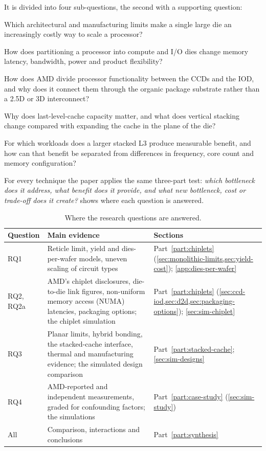 It is divided into four sub-questions, the second with a supporting question:

\begin{description}[leftmargin=1.2cm,style=nextline]
  \item[RQ1] Which architectural and manufacturing limits make a single large die an increasingly costly way to scale a processor?
  \item[RQ2] How does partitioning a processor into compute and I/O dies change memory latency, bandwidth, power and product flexibility?
  \item[RQ2a] How does AMD divide processor functionality between the CCDs and the IOD, and why does it connect them through the organic package substrate rather than a 2.5D or 3D interconnect?
  \item[RQ3] Why does last-level-cache capacity matter, and what does vertical stacking change compared with expanding the cache in the plane of the die?
  \item[RQ4] For which workloads does a larger stacked L3 produce measurable benefit, and how can that benefit be separated from differences in frequency, core count and memory configuration?
\end{description}

For every technique the paper applies the same three-part test: \emph{which bottleneck does it address, what benefit does it provide, and what new bottleneck, cost or trade-off does it create?}  shows where each question is answered.

\begin{table}[htbp]
  \centering
  \caption[Where the research questions are answered]{Where the research questions are answered.}
  \label{tab:rq-map}
  \small
  \begin{tabularx}{\textwidth}{@{}lX>{\raggedright\arraybackslash}p{4.2cm}@{}}
    \toprule
    \textbf{Question} & \textbf{Main evidence} & \textbf{Sections} \\
    \midrule
    RQ1 & Reticle limit, yield and dies-per-wafer models, uneven scaling of circuit types & Part~\ref{part:chiplets} (\cref{sec:monolithic-limits,sec:yield-cost}); \cref{app:dies-per-wafer} \\
    RQ2, RQ2a & AMD's chiplet disclosures, die-to-die link figures, non-uniform memory access (NUMA) latencies, packaging options; the chiplet simulation & Part~\ref{part:chiplets} (\cref{sec:ccd-iod,sec:d2d,sec:packaging-options}); \cref{sec:sim-chiplet} \\
    RQ3 & Planar limits, hybrid bonding, the stacked-cache interface, thermal and manufacturing evidence; the simulated design comparison & Part~\ref{part:stacked-cache}; \cref{sec:sim-designs} \\
    RQ4 & AMD-reported and independent measurements, graded for confounding factors; the simulations & Part~\ref{part:case-study} (\cref{sec:sim-study}) \\
    All & Comparison, interactions and conclusions & Part~\ref{part:synthesis} \\
    \bottomrule
  \end{tabularx}
\end{table}

